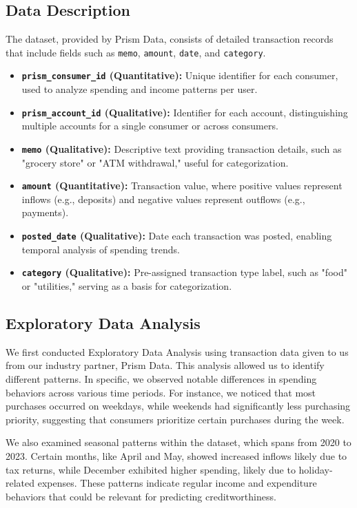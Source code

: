 \documentclass[12pt,letterpaper]{article}
\begin{document}
\subsection{Data Description}
The dataset, provided by Prism Data, consists of detailed transaction records that include fields such as \texttt{memo}, \texttt{amount}, \texttt{date}, and \texttt{category}.
\begin{itemize}
    \item \textbf{\texttt{prism\_consumer\_id} (Quantitative):} Unique identifier for each consumer, used to analyze spending and income patterns per user.
    \item \textbf{\texttt{prism\_account\_id} (Qualitative):} Identifier for each account, distinguishing multiple accounts for a single consumer or across consumers.
    \item \textbf{\texttt{memo} (Qualitative):} Descriptive text providing transaction details, such as "grocery store" or "ATM withdrawal," useful for categorization.
    \item \textbf{\texttt{amount} (Quantitative):} Transaction value, where positive values represent inflows (e.g., deposits) and negative values represent outflows (e.g., payments).
    \item \textbf{\texttt{posted\_date} (Qualitative):} Date each transaction was posted, enabling temporal analysis of spending trends.
    \item \textbf{\texttt{category} (Qualitative):} Pre-assigned transaction type label, such as "food" or "utilities," serving as a basis for categorization.
\end{itemize}

\subsection{Exploratory Data Analysis}
We first conducted Exploratory Data Analysis using transaction data given to us from our industry partner, Prism Data. This analysis allowed us to identify different patterns. In specific, we observed notable differences in spending behaviors across various time periods. For instance, we noticed that most purchases occurred on weekdays, while weekends had significantly less purchasing priority, suggesting that consumers prioritize certain purchases during the week. 

We also examined seasonal patterns within the dataset, which spans from 2020 to 2023. Certain months, like April and May, showed increased inflows likely due to tax returns, while December exhibited higher spending, likely due to holiday-related expenses. These patterns indicate regular income and expenditure behaviors that could be relevant for predicting creditworthiness.
\end{document}
